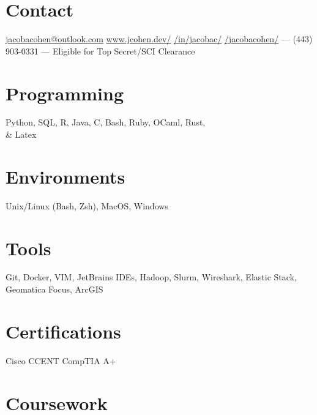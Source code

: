 \documentclass[print]{friggeri-cv} %
\begin{document}


\begin{aside} %
\section{Contact}
\href{mailto:jacobacohen@outlook.com}{jacobacohen@outlook.com}
\href{https://jcohen.dev}{\faInfoCircle www.jcohen.dev/}
\href{https://linkedin.com/in/jacobac/}{\faLinkedinSquare /in/jacobac/}
\href{https://github.com/jacobacohen}{\faGithub /jacobacohen/}
---
\faPhone  (443) 903-0331
---
Eligible for Top Secret/SCI Clearance
\section{Programming}
Python, SQL, R, Java, C, Bash, Ruby, OCaml, Rust, \\ \& Latex
\section{Environments}
Unix/Linux (Bash, Zsh), MacOS, Windows

\section{Tools}
Git, Docker, VIM, JetBrains IDEs, Hadoop, Slurm, Wireshark, Elastic Stack, Geomatica Focus, ArcGIS

\section{Certifications}
Cisco CCENT
CompTIA A+

\section{Coursework}


\end{aside}
\end{document}
